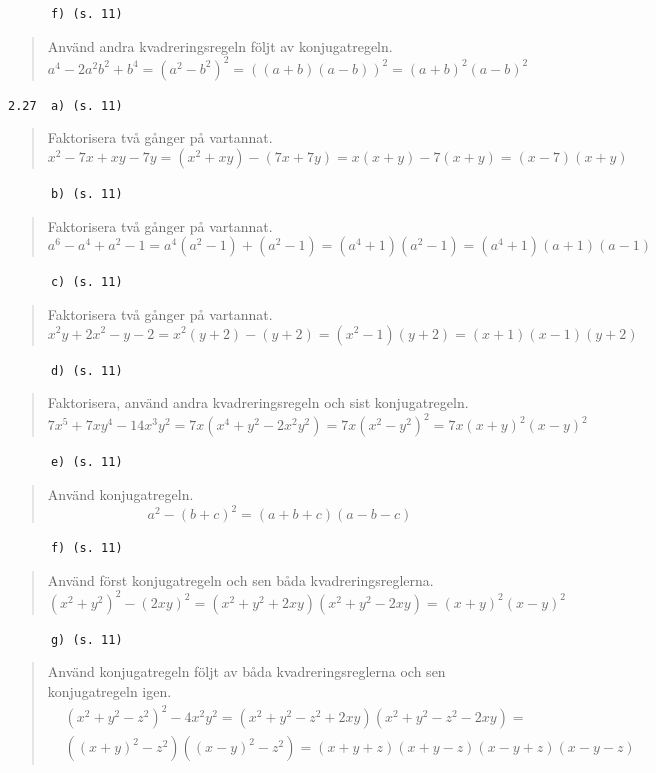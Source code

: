 \documentclass[a4paper]{article}
\newcommand{\tskcol}[1]{\textcolor{tskcol}{#1}}
\begin{document}
	\texttt{\tskcol{~~~~~~f) (s. 11)}}
	\begin{quotation}
		\noindent
		Använd andra kvadreringsregeln följt av konjugatregeln.
		\[a^4-2a^2b^2+b^4=(a^2-b^2)^2=((a+b)(a-b))^2=(a+b)^2(a-b)^2\]
	\end{quotation}
	
	\texttt{\tskcol{2.27~~a) (s. 11)}}
	\begin{quotation}
		\noindent
		Faktorisera två gånger på vartannat.
		\[x^2-7x+xy-7y=(x^2+xy)-(7x+7y)=x(x+y)-7(x+y)=(x-7)(x+y)\]
	\end{quotation}
	
	\texttt{\tskcol{~~~~~~b) (s. 11)}}
	\begin{quotation}
		\noindent
		Faktorisera två gånger på vartannat.
		\[a^6-a^4+a^2-1=a^4(a^2-1)+(a^2-1)=(a^4+1)(a^2-1)=(a^4+1)(a+1)(a-1)\]
	\end{quotation}
	
	\texttt{\tskcol{~~~~~~c) (s. 11)}}
	\begin{quotation}
		\noindent
		Faktorisera två gånger på vartannat.
		\[x^2y+2x^2-y-2=x^2(y+2)-(y+2)=(x^2-1)(y+2)=(x+1)(x-1)(y+2)\]
	\end{quotation}
	
	\texttt{\tskcol{~~~~~~d) (s. 11)}}
	\begin{quotation}
		\noindent
		Faktorisera, använd andra kvadreringsregeln och sist konjugatregeln.
		\[7x^5+7xy^4-14x^3y^2=7x(x^4+y^2-2x^2y^2)=7x(x^2-y^2)^2=7x(x+y)^2(x-y)^2\]
	\end{quotation}
	
	\texttt{\tskcol{~~~~~~e) (s. 11)}}
	\begin{quotation}
		\noindent
		Använd konjugatregeln.
		\[a^2-(b+c)^2=(a+b+c)(a-b-c)\]
	\end{quotation}
	
	\pagebreak
	\texttt{\tskcol{~~~~~~f) (s. 11)}}
	\begin{quotation}
		\noindent
		Använd först konjugatregeln och sen båda kvadreringsreglerna.
		\[(x^2+y^2)^2-(2xy)^2=(x^2+y^2+2xy)(x^2+y^2-2xy)=(x+y)^2(x-y)^2\]
	\end{quotation}
	
	\texttt{\tskcol{~~~~~~g) (s. 11)}}
	\begin{quotation}
		\noindent
		Använd konjugatregeln följt av båda kvadreringsreglerna och sen konjugatregeln igen.
		\begin{align*}
			&(x^2+y^2-z^2)^2-4x^2y^2=
			(x^2+y^2-z^2+2xy)(x^2+y^2-z^2-2xy)= \\
			&((x+y)^2-z^2)((x-y)^2-z^2)=
			(x+y+z)(x+y-z)(x-y+z)(x-y-z)
		\end{align*}
	\end{quotation}
	
\end{document}
